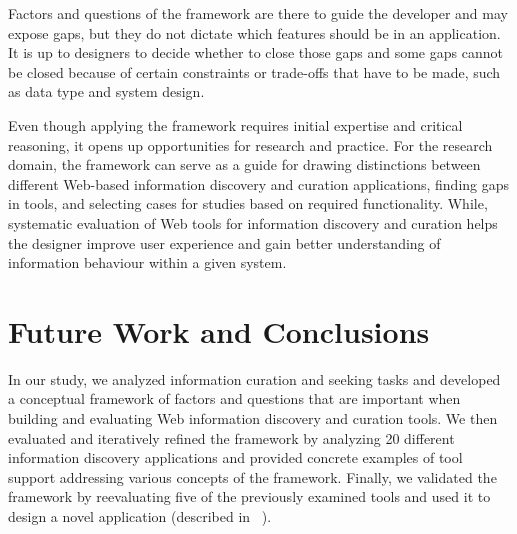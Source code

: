 \documentclass{sigchi}
\begin{document}
Factors and questions of the framework are there to guide the developer and may expose gaps, but they do not dictate which features should be in an application. It is up to designers to decide whether to close those gaps and some gaps cannot be closed because of certain constraints or trade-offs that have to be made, such as data type and system design.


Even though applying the framework requires initial expertise and critical reasoning, it opens up opportunities for research and practice. 
For the research domain, the framework can serve as a guide for drawing distinctions between different Web-based information discovery and curation applications, finding gaps in tools, and selecting cases for studies based on required functionality. 
While, systematic evaluation of Web tools for information discovery and curation helps the designer improve user experience and gain better understanding of information behaviour within a given system. 

\section{Future Work and Conclusions}
\label{section:future_work}
In our study, we analyzed information curation and seeking tasks and developed a conceptual framework of factors and questions that are important when building and evaluating Web information discovery and curation tools. We then evaluated and iteratively refined the framework by analyzing 20 different information discovery applications and provided concrete examples of tool support addressing various concepts of the framework. Finally, we validated the framework by reevaluating five of the previously examined tools and used it to design a novel application (described in ~\cite{voyloshnikova2015}). 
\end{document}
